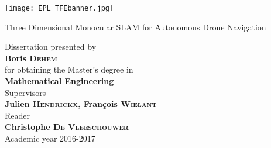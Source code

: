 \begin{titlepage}
	\begin{center}
		\texttt{[image: EPL\_TFEbanner.jpg]}
	\end{center}
	\vspace*{4pt}
	\begin{flushright}
	    \color{UCLblue}  \selectfont
	    {\huge Three Dimensional Monocular SLAM for Autonomous Drone Navigation \par}
	    \vspace*{12pt}
		\large Dissertation presented by \\
		\textbf{Boris \textsc{Dehem}} \\
		\vspace*{12pt}
		for obtaining the Master's degree in \\
		\textbf{Mathematical Engineering}\\
		\vspace*{12pt}
		Supervisors\\
		\textbf{Julien \textsc{Hendrickx}, François \textsc{Wielant}}	\\
		\vspace*{12pt}
		Reader \\
		\textbf{Christophe \textsc{De Vleeschouwer}}	\\
		\vspace*{12pt}
		Academic year 2016-2017 \\
	\end{flushright}
	\vspace*{6pt}
	\color{EPLblue}{\rule{18.5cm}{8.25cm}}
\end{titlepage}

\thispagestyle{empty}		%
\hbox{}
\newpage
